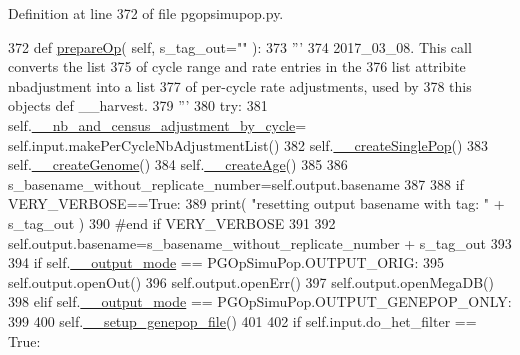 Definition at line 372 of file pgopsimupop.\+py.


\begin{DoxyCode}
372     \textcolor{keyword}{def }\hyperlink{classnegui_1_1pgopsimupop_1_1PGOpSimuPop_a2f255ee2acb3d3f0341cc2f7cf1e3ad3}{prepareOp}( self, s\_tag\_out="" ):
373         \textcolor{stringliteral}{'''}
374 \textcolor{stringliteral}{        2017\_03\_08.  This call converts the list}
375 \textcolor{stringliteral}{        of cycle range and rate entries in the }
376 \textcolor{stringliteral}{        list attribite nbadjustment into a list}
377 \textcolor{stringliteral}{        of per-cycle rate adjustments, used by}
378 \textcolor{stringliteral}{        this objects def \_\_harvest.}
379 \textcolor{stringliteral}{        '''}
380         \textcolor{keywordflow}{try}:
381             self.\hyperlink{classnegui_1_1pgopsimupop_1_1PGOpSimuPop_aba6c04f12abd1c5f3a0b67142b3f6dd7}{\_\_nb\_and\_census\_adjustment\_by\_cycle}=
      self.input.makePerCycleNbAdjustmentList()
382             self.\hyperlink{classnegui_1_1pgopsimupop_1_1PGOpSimuPop_a74927b817cdaa9db7f35389ef9f66326}{\_\_createSinglePop}()
383             self.\hyperlink{classnegui_1_1pgopsimupop_1_1PGOpSimuPop_a77f91a4a8825dc995eef67b94b725d0d}{\_\_createGenome}()
384             self.\hyperlink{classnegui_1_1pgopsimupop_1_1PGOpSimuPop_a3cfa5a02a38b3e0c351df820c7b845dd}{\_\_createAge}()   
385             
386             s\_basename\_without\_replicate\_number=self.output.basename    
387             
388             \textcolor{keywordflow}{if} VERY\_VERBOSE==\textcolor{keyword}{True}:
389                 print( \textcolor{stringliteral}{"resetting output basename with tag: "} + s\_tag\_out )
390             \textcolor{comment}{#end if VERY\_VERBOSE}
391 
392             self.output.basename=s\_basename\_without\_replicate\_number + s\_tag\_out
393 
394             \textcolor{keywordflow}{if} self.\hyperlink{classnegui_1_1pgopsimupop_1_1PGOpSimuPop_abac5c621286b240967702ca9cd23dddf}{\_\_output\_mode} == PGOpSimuPop.OUTPUT\_ORIG:
395                 self.output.openOut()
396                 self.output.openErr()
397                 self.output.openMegaDB()
398             \textcolor{keywordflow}{elif} self.\hyperlink{classnegui_1_1pgopsimupop_1_1PGOpSimuPop_abac5c621286b240967702ca9cd23dddf}{\_\_output\_mode} == PGOpSimuPop.OUTPUT\_GENEPOP\_ONLY:
399 
400                 self.\hyperlink{classnegui_1_1pgopsimupop_1_1PGOpSimuPop_a3a4b65a9bc8bb20885736acd03ab2d8f}{\_\_setup\_genepop\_file}()
401 
402                 \textcolor{keywordflow}{if} self.input.do\_het\_filter == \textcolor{keyword}{True}:

\end{DoxyCode}
